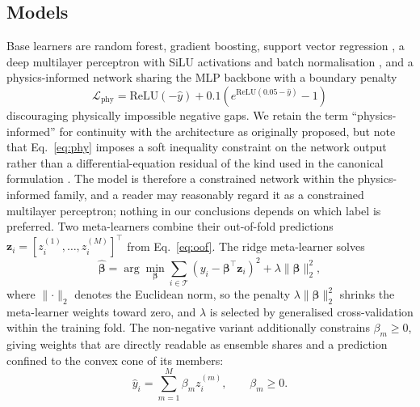 \documentclass{ieeeaccess}
\begin{document}
\subsection{Models}
Base learners are random forest, gradient boosting, support vector regression \cite{drucker1996support}, a deep multilayer perceptron with SiLU activations \cite{elfwing2018sigmoid,ramachandran2017searching} and batch normalisation \cite{ioffe2015batch}, and a physics-informed network sharing the MLP backbone with a boundary penalty
\begin{equation}
\mathcal{L}_{\mathrm{phy}} = \mathrm{ReLU}(-\hat{y}) + 0.1\left(e^{\mathrm{ReLU}(0.05-\hat{y})}-1\right)
\label{eq:phy}
\end{equation}
discouraging physically impossible negative gaps. We retain the term ``physics-informed'' for continuity with the architecture as originally proposed, but note that Eq.~\eqref{eq:phy} imposes a soft inequality constraint on the network output rather than a differential-equation residual of the kind used in the canonical formulation \cite{raissi2019physics}. The model is therefore a constrained network within the physics-informed family, and a reader may reasonably regard it as a constrained multilayer perceptron; nothing in our conclusions depends on which label is preferred. Two meta-learners combine their out-of-fold predictions $\mathbf{z}_i = [z_i^{(1)},\dots,z_i^{(M)}]^\top$ from Eq.~\eqref{eq:oof}. The ridge meta-learner solves
\begin{equation}
\hat{\boldsymbol{\beta}} = \arg\min_{\boldsymbol{\beta}}
  \sum_{i \in \mathcal{T}} \left(y_i - \boldsymbol{\beta}^\top \mathbf{z}_i\right)^2
  + \lambda \lVert \boldsymbol{\beta} \rVert_2^2,
\label{eq:ridge}
\end{equation}
where $\lVert \cdot \rVert_2$ denotes the Euclidean norm, so the penalty $\lambda \lVert \boldsymbol{\beta} \rVert_2^2$ shrinks the meta-learner weights toward zero, and $\lambda$ is selected by generalised cross-validation within the training fold. The non-negative variant \cite{breiman1996stacked} additionally constrains $\beta_m \geq 0$, giving weights that are directly readable as ensemble shares and a prediction confined to the convex cone of its members:
\begin{equation}
\hat{y}_i = \sum_{m=1}^{M} \beta_m z_i^{(m)}, \qquad \beta_m \geq 0 .
\label{eq:nnls}
\end{equation}
\end{document}
